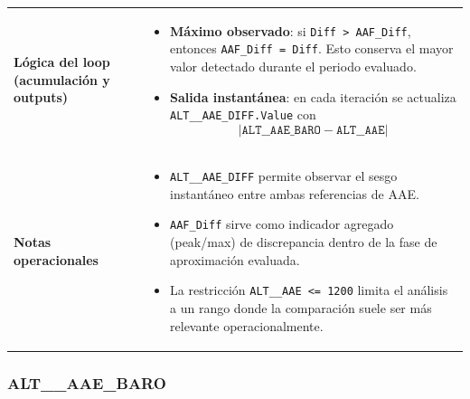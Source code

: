\documentclass[11pt,a4paper]{article}
\begin{document}
\begin{longtable}{p{5cm} p{9.5cm}}
		\textbf{Lógica del loop (acumulación y outputs)} &
		\begin{itemize}
			\item \textbf{Máximo observado}: si \texttt{Diff > AAF\_Diff}, entonces \texttt{AAF\_Diff = Diff}. Esto conserva el mayor valor detectado durante el periodo evaluado.
			\item \textbf{Salida instantánea}: en cada iteración se actualiza \texttt{ALT\_\_AAE\_DIFF.Value} con
			\[
			\left| \texttt{ALT\_\_AAE\_BARO} - \texttt{ALT\_\_AAE} \right|
			\]
		\end{itemize}
		\\
		
		\textbf{Notas operacionales} &
		\begin{itemize}
			\item \texttt{ALT\_\_AAE\_DIFF} permite observar el sesgo instantáneo entre ambas referencias de AAE.
			\item \texttt{AAF\_Diff} sirve como indicador agregado (peak/max) de discrepancia dentro de la fase de aproximación evaluada.
			\item La restricción \texttt{ALT\_\_AAE <= 1200} limita el análisis a un rango donde la comparación suele ser más relevante operacionalmente.
		\end{itemize}
		\\ \hline
	\end{longtable}
	
	\subsubsection{ALT\_\_AAE\_BARO}
	
\end{document}
